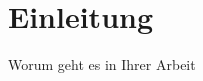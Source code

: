 \chapter{Einleitung}  
\label{chap:einleitung}
\chapterauthor{\authorMarco}

Worum geht es in Ihrer Arbeit \citep{Einfuehrung}



